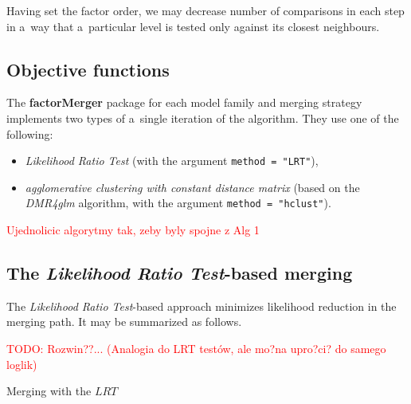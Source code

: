 \documentclass[12pt]{article}
\newcommand{\factorMerger}{\textbf{factorMerger }}
\newcommand{\todo}{\textcolor{red}}
\newcommand{\code}{\texttt}
\begin{document}
Having set the factor order, we may decrease number of comparisons in each step in a~way that a~particular level is tested only against its closest neighbours.



\subsection{Objective functions}

The \factorMerger package for each model family and merging strategy implements two types of a~single iteration of the algorithm. They use one of the following:

\begin{itemize}

\item \emph{Likelihood Ratio Test} (with the argument \code{method = "LRT"}),
\item \emph{agglomerative clustering with constant distance matrix} (based on the \emph{DMR4glm} algorithm, with the argument \code{method = "hclust"}). 

\end{itemize}


\todo{Ujednolicic algorytmy tak, zeby byly spojne z Alg 1}

\subsection{The \emph{Likelihood Ratio Test}-based merging}

The \emph{Likelihood Ratio Test}-based approach minimizes likelihood reduction in the merging path. It may be summarized as follows.

\todo{TODO: Rozwin??... (Analogia do LRT testów, ale mo?na upro?ci? do samego loglik)}

\begin{algorithm}[H]
\caption{Merging with the $LRT$}
\begin{algorithmic}[2]

    
\EndWhile
    \EndFunction
\end{algorithmic}
\end{algorithm}
\end{document}
